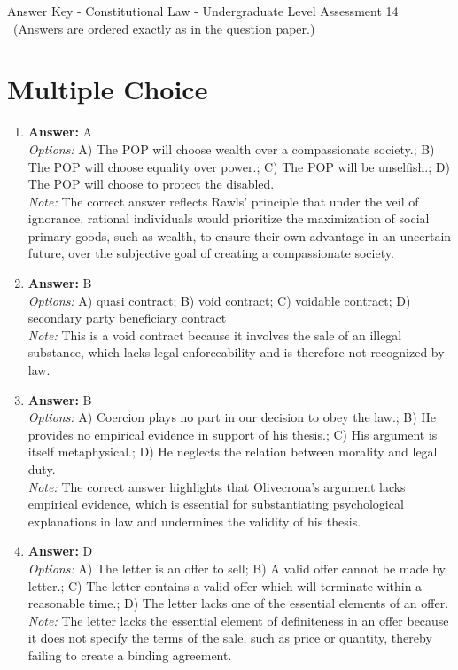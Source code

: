 \documentclass[12pt]{article}
\begin{document}
\begin{center}
Answer Key - Constitutional Law - Undergraduate Level Assessment 14 \
\small (Answers are ordered exactly as in the question paper.)
\end{center}

\section*{Multiple Choice}
\begin{enumerate}[label=\arabic*.]
\item \textbf{Answer:} A
\\ \textit{Options:} A) The POP will choose wealth over a compassionate society.; B) The POP will choose equality over power.; C) The POP will be unselfish.; D) The POP will choose to protect the disabled.
\\ \textit{Note:} The correct answer reflects Rawls' principle that under the veil of ignorance, rational individuals would prioritize the maximization of social primary goods, such as wealth, to ensure their own advantage in an uncertain future, over the subjective goal of creating a compassionate society.
\item \textbf{Answer:} B
\\ \textit{Options:} A) quasi contract; B) void contract; C) voidable contract; D) secondary party beneficiary contract
\\ \textit{Note:} This is a void contract because it involves the sale of an illegal substance, which lacks legal enforceability and is therefore not recognized by law.
\item \textbf{Answer:} B
\\ \textit{Options:} A) Coercion plays no part in our decision to obey the law.; B) He provides no empirical evidence in support of his thesis.; C) His argument is itself metaphysical.; D) He neglects the relation between morality and legal duty.
\\ \textit{Note:} The correct answer highlights that Olivecrona's argument lacks empirical evidence, which is essential for substantiating psychological explanations in law and undermines the validity of his thesis.
\item \textbf{Answer:} D
\\ \textit{Options:} A) The letter is an offer to sell; B) A valid offer cannot be made by letter.; C) The letter contains a valid offer which will terminate within a reasonable time.; D) The letter lacks one of the essential elements of an offer.
\\ \textit{Note:} The letter lacks the essential element of definiteness in an offer because it does not specify the terms of the sale, such as price or quantity, thereby failing to create a binding agreement.

\end{enumerate}
\end{document}
